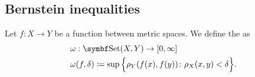 \subsection{Bernstein inequalities}\label{subsec:bernstein_inequalities}

\begin{definition}\label{def:modulus_of_continuity}
  Let \( f: X \to Y \) be a function between metric spaces. We define the  as
  \begin{align*}
     & \omega: \Cat{Set}(X, Y) \to [0, \infty]                                                         \\
     & \omega(f, \delta) \coloneqq \sup \Big\{ \rho_Y(f(x), f(y)) \colon \rho_X(x, y) < \delta \Big\}.
  \end{align*}
\end{definition}

